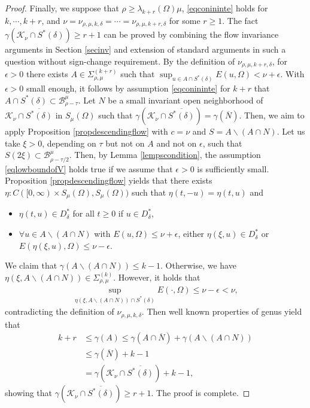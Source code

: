 \documentclass[10pt,a4paper]{article}
\theoremstyle{definition} \theoremstyle{remark}
\numberwithin{equation}{section}
\newcommand{\B}{\mathcal{B}}
\newcommand{\K}{\mathcal{K}}
\newcommand{\la}{\lambda}
\newcommand{\ga}{\gamma}
\newcommand{\ep}{\epsilon}
\begin{document}
\begin{proof}
    Finally, we suppose that $\rho \geq \la_{k+r}(\Omega)\mu$, \eqref{eqconininte} holds for $k, \cdots, k+r$, and $\nu = \nu_{\rho,\mu,k,\delta} = \cdots = \nu_{\rho,\mu,k+r,\delta}$ for some $r \ge 1$. The fact $\ga(\K_{\nu} \cap S^*(\delta)) \geq r+1$ can be proved by combining the flow invariance arguments in Section \ref{secinv} and extension of standard arguments in such a question without sign-change requirement. By the definition of $\nu_{\rho,\mu,k+r,\delta}$, for $\ep > 0$ there exists $A \in \Sigma_{\rho,\mu}^{(k+r)}$ such that $\sup_{u \in A \cap S^*(\delta)}E(u,\Omega) < \nu + \ep$. With $\ep > 0$ small enough, it follows by assumption \eqref{eqconininte} for $k+r$ that $A \cap S^*(\delta) \subset \B_{\rho-\tau}^\mu$. Let $N$ be a small invariant open neighborhood of $\mathcal{K}_\nu \cap \overline{S^*(\delta)}$ in $S_\mu(\Omega)$ such that $\ga(\mathcal{K}_\nu \cap \overline{S^*(\delta)}) = \ga(\overline{N})$. Then, we aim to apply Proposition \ref{propdescendingflow} with $c  = \nu$ and $S = A \backslash (A \cap N)$. Let us take $\xi > 0$, depending on $\tau$ but not on $A$ and not on $\ep$, such that $S(2\xi) \subset \B_{\rho-\tau/2}^\mu$. Then, by Lemma \ref{lempscondition}, the assumption \eqref{eqlowboundofV} holds true if we assume that $\ep > 0$ is sufficiently small. Proposition \ref{propdescendingflow} yields that there exists $\eta: C([0,\infty) \times S_\mu(\Omega), S_\mu(\Omega))$ such that $\eta(t,-u) = \eta(t,u)$ and
    \begin{itemize}
    	\item[(i)] $\eta(t,u) \in D_\delta^*$ for all $t \geq 0$ if $u \in D_\delta^*$,
    	\item[(ii)] $\forall u \in A \backslash (A \cap N)$ with $E(u,\Omega) \leq \nu + \epsilon$, either $\eta(\xi,u) \in D_\delta^*$ or $E(\eta(\xi,u),\Omega) \leq \nu -\epsilon$.
    \end{itemize}
    We claim that $\ga(A \backslash (A \cap N)) \le k -1$. Otherwise, we have $\eta(\xi,A \backslash (A \cap N)) \in \Sigma_{\rho,\mu}^{(k)}$. However, it holds that
    \begin{align*}
    	\sup_{\eta(\xi,A \backslash (A \cap N)) \cap S^*(\delta)}E(\cdot,\Omega) \leq \nu - \ep < \nu,
    \end{align*}
    contradicting the definition of $\nu_{\rho,\mu,k,\delta}$. Then well known properties of genus yield that
    \begin{align*}
    	k + r & \le \ga(A) \le \ga(A \cap \overline{N}) + \ga(A \backslash (A \cap N)) \\
    	& \le \ga(\overline{N}) + k -1 \\
    	& = \ga(\mathcal{K}_\nu \cap \overline{S^*(\delta)}) + k -1,
    \end{align*}
    showing that $\ga(\mathcal{K}_\nu \cap \overline{S^*(\delta)}) \ge r +1$. The proof is complete.
\end{proof}
\end{document}
